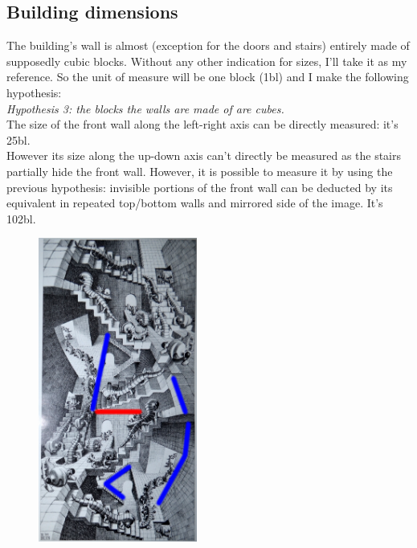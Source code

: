 \documentclass[12pt, a4paper]{article}
\begin{document}
\subsection{Building dimensions}

The building's wall is almost (exception for the doors and stairs) entirely made of supposedly cubic blocks. Without any other indication for sizes, I'll take it as my reference. So the unit of measure will be one block (1bl) and I make the following hypothesis:\\

\emph{Hypothesis 3: the blocks the walls are made of are cubes.}\\

The size of the front wall along the left-right axis can be directly measured: it's 25bl.\\

However its size along the up-down axis can't directly be measured as the stairs partially hide the front wall. However, it is possible to measure it by using the previous hypothesis: invisible portions of the front wall can be deducted by its equivalent in repeated top/bottom walls and mirrored side of the image. It's 102bl.\\

\begin{center}
\begin{figure}[H]
\centering\includegraphics[height=10cm]{./dimension.png}\\
\end{figure}
\end{center}
\end{document}
